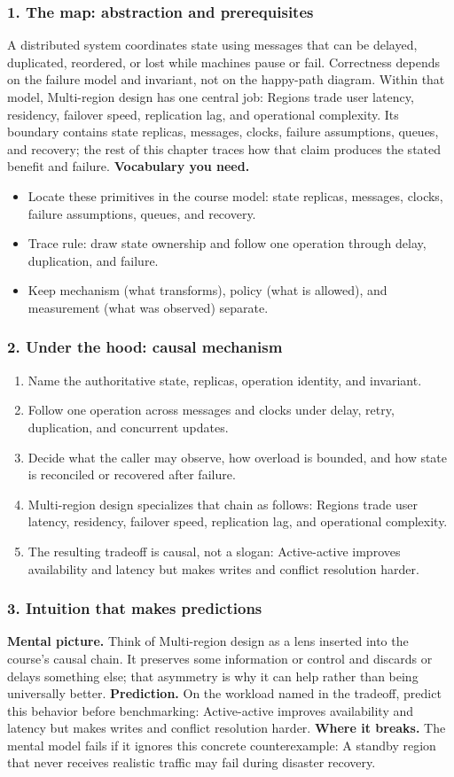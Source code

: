 \subsubsection*{1. The map: abstraction and prerequisites}
A distributed system coordinates state using messages that can be delayed, duplicated, reordered, or lost while machines pause or fail. Correctness depends on the failure model and invariant, not on the happy-path diagram.
Within that model, Multi-region design has one central job: Regions trade user latency, residency, failover speed, replication lag, and operational complexity. Its boundary contains state replicas, messages, clocks, failure assumptions, queues, and recovery; the rest of this chapter traces how that claim produces the stated benefit and failure.
\textbf{Vocabulary you need.}\begin{itemize}
\item Locate these primitives in the course model: state replicas, messages, clocks, failure assumptions, queues, and recovery.
\item Trace rule: draw state ownership and follow one operation through delay, duplication, and failure.
\item Keep mechanism (what transforms), policy (what is allowed), and measurement (what was observed) separate.
\end{itemize}
\subsubsection*{2. Under the hood: causal mechanism}\begin{enumerate}
\item Name the authoritative state, replicas, operation identity, and invariant.
\item Follow one operation across messages and clocks under delay, retry, duplication, and concurrent updates.
\item Decide what the caller may observe, how overload is bounded, and how state is reconciled or recovered after failure.
\item Multi-region design specializes that chain as follows: Regions trade user latency, residency, failover speed, replication lag, and operational complexity.
\item The resulting tradeoff is causal, not a slogan: Active-active improves availability and latency but makes writes and conflict resolution harder.
\end{enumerate}
\subsubsection*{3. Intuition that makes predictions}
\textbf{Mental picture.} Think of Multi-region design as a lens inserted into the course's causal chain. It preserves some information or control and discards or delays something else; that asymmetry is why it can help rather than being universally better.
\textbf{Prediction.} On the workload named in the tradeoff, predict this behavior before benchmarking: Active-active improves availability and latency but makes writes and conflict resolution harder.
\textbf{Where it breaks.} The mental model fails if it ignores this concrete counterexample: A standby region that never receives realistic traffic may fail during disaster recovery.
